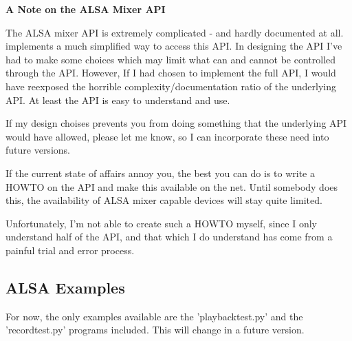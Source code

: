\textbf{A Note on the ALSA Mixer API}

The ALSA mixer API is extremely complicated - and hardly documented at
all.  implements a much simplified way to access
this API. In designing the API I've had to make some choices which may
limit what can and cannot be controlled through the API. However, If I
had chosen to implement the full API, I would have reexposed the
horrible complexity/documentation ratio of the underlying API.  At
least the  API is easy to understand and use.

If my design choises prevents you from doing something that the
underlying API would have allowed, please let me know, so I can
incorporate these need into future versions.

If the current state of affairs annoy you, the best you can do is to
write a HOWTO on the API and make this available on the net. Until
somebody does this, the availability of ALSA mixer capable devices
will stay quite limited.

Unfortunately, I'm not able to create such a HOWTO myself, since I
only understand half of the API, and that which I do understand has
come from a painful trial and error process.



\subsection{ALSA Examples \label{pcm-example}}

For now, the only examples available are the 'playbacktest.py' and the
'recordtest.py' programs included.  This will change in a future
version.
